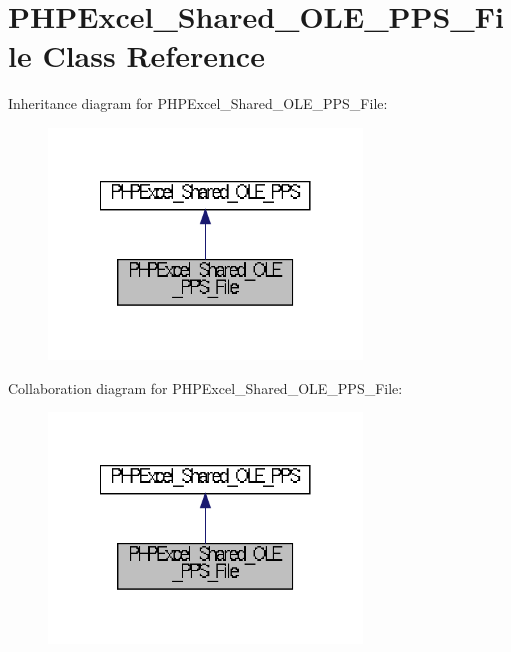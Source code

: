 \section{P\+H\+P\+Excel\+\_\+\+Shared\+\_\+\+O\+L\+E\+\_\+\+P\+P\+S\+\_\+\+File Class Reference}
\label{class_p_h_p_excel___shared___o_l_e___p_p_s___file}


Inheritance diagram for P\+H\+P\+Excel\+\_\+\+Shared\+\_\+\+O\+L\+E\+\_\+\+P\+P\+S\+\_\+\+File\+:\nopagebreak
\begin{figure}[H]
\begin{center}
\leavevmode
\includegraphics[width=236pt]{class_p_h_p_excel___shared___o_l_e___p_p_s___file__inherit__graph}
\end{center}
\end{figure}


Collaboration diagram for P\+H\+P\+Excel\+\_\+\+Shared\+\_\+\+O\+L\+E\+\_\+\+P\+P\+S\+\_\+\+File\+:\nopagebreak
\begin{figure}[H]
\begin{center}
\leavevmode
\includegraphics[width=236pt]{class_p_h_p_excel___shared___o_l_e___p_p_s___file__coll__graph}
\end{center}
\end{figure}
